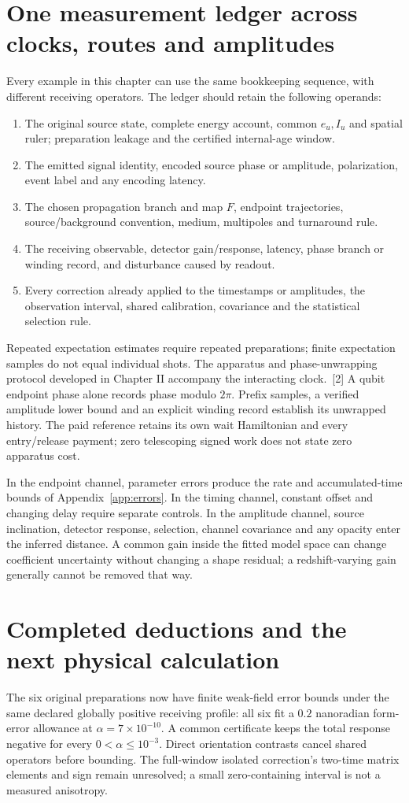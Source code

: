 \documentclass[10pt,twocolumn,letterpaper]{article}
\begin{document}
\section{One measurement ledger across clocks, routes and amplitudes}
Every example in this chapter can use the same bookkeeping sequence, with different receiving operators. The ledger should retain the following operands:
\begin{enumerate}[leftmargin=*,itemsep=2pt]
\item The original source state, complete energy account, common $e_u,I_u$ and spatial ruler; preparation leakage and the certified internal-age window.
\item The emitted signal identity, encoded source phase or amplitude, polarization, event label and any encoding latency.
\item The chosen propagation branch and map $F$, endpoint trajectories, source/background convention, medium, multipoles and turnaround rule.
\item The receiving observable, detector gain/response, latency, phase branch or winding record, and disturbance caused by readout.
\item Every correction already applied to the timestamps or amplitudes, the observation interval, shared calibration, covariance and the statistical selection rule.
\end{enumerate}
Repeated expectation estimates require repeated preparations; finite expectation samples do not equal individual shots. The apparatus and phase-unwrapping protocol developed in Chapter II accompany the interacting clock.~[2] A qubit endpoint phase alone records phase modulo $2\pi$. Prefix samples, a verified amplitude lower bound and an explicit winding record establish its unwrapped history. The paid reference retains its own wait Hamiltonian and every entry/release payment; zero telescoping signed work does not state zero apparatus cost.

In the endpoint channel, parameter errors produce the rate and accumulated-time bounds of Appendix~\ref{app:errors}. In the timing channel, constant offset and changing delay require separate controls. In the amplitude channel, source inclination, detector response, selection, channel covariance and any opacity enter the inferred distance. A common gain inside the fitted model space can change coefficient uncertainty without changing a shape residual; a redshift-varying gain generally cannot be removed that way.

\section{Completed deductions and the next physical calculation}
The six original preparations now have finite weak-field error bounds under the same declared globally positive receiving profile: all six fit a $0.2$ nanoradian form-error allowance at $\alpha=7\times10^{-10}$. A common certificate keeps the total response negative for every $0<\alpha\le10^{-3}$. Direct orientation contrasts cancel shared operators before bounding. The full-window isolated correction's two-time matrix elements and sign remain unresolved; a small zero-containing interval is not a measured anisotropy.
\end{document}
